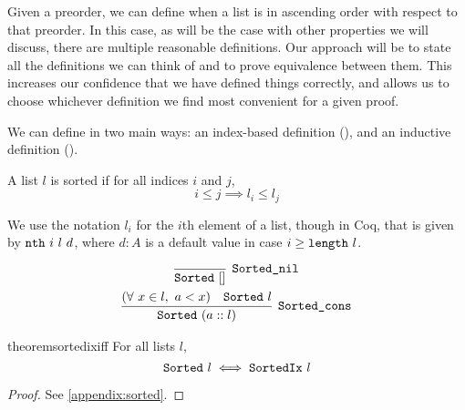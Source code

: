 \documentclass[sigplan,10pt,anonymous,review]{thesis}
\begin{document}
Given a preorder, we can define when a list is in ascending order with
respect to that preorder. In this case, as will be the case with other
properties we will discuss, there are multiple reasonable definitions.
Our approach will be to state all the definitions we can think of and
to prove equivalence between them. This increases our confidence that
we have defined things correctly, and allows us to choose whichever
definition we find most convenient for a given proof.

We can define  in two main ways: an index-based definition
(), and an inductive definition ().

\begin{definition}[SortedIx]
  A list $l$ is sorted if for all indices $i$ and $j$,
  \begin{equation*}
    i \le j \implies l_i \le l_j
  \end{equation*}
\end{definition}

We use the notation $l_i$ for the $i$th element of a list, though in
Coq, that is given by $\texttt{\textup{nth}}~i~l~d$, where $d:A$ is a default
value in case $i \ge \texttt{\textup{length}}~l$.


\begin{definition}[Sorted]
  \label{def:sorted}
  \begin{gather*}
    \infer[\var{Sorted\_nil}]{\var{Sorted}~[]}{}
    \\
    \infer[\var{Sorted\_cons}]{\var{Sorted}~(a :: l)}{%
      (\forall~x \in l,~a < x) & \var{Sorted}~l
    }
  \end{gather*}
\end{definition}

\begin{restatable}{theorem}{sortedixiff}
  For all lists $l$,
  \begin{equation*}
    \texttt{\textup{Sorted}}~l \iff \texttt{\textup{SortedIx}}~l
  \end{equation*}
\end{restatable}
\begin{proof}
  See \cref{appendix:sorted}.
\end{proof}
\end{document}
